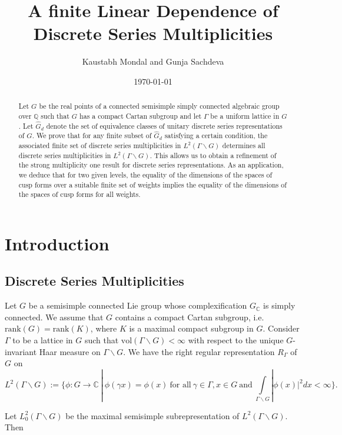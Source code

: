 \documentclass[11 pt]{amsart}
\title[Linear dependence of discrete series multiplicities]{A finite Linear Dependence of Discrete Series Multiplicities}
\author{Kaustabh Mondal and Gunja Sachdeva}
\date{\today}
\newcommand{\Q}{{\mathbb Q}}
\newcommand{\C}{{\mathbb C}}
\theoremstyle{definition}
\numberwithin{equation}{section}
\begin{document}
\begin{abstract}
    Let $G$ be the real points of a connected semisimple simply connected algebraic group over $\Q$ such that $G$ has a compact Cartan subgroup and let $\Gamma$ be a uniform lattice in $G$. Let $\widehat{G}_d$ denote the set of equivalence classes of unitary discrete series representations of $G$. We prove that for any finite subset of $\widehat{G}_d$ satisfying a certain condition, the associated finite set of discrete series multiplicities in $L^2(\Gamma \backslash G)$ determines all discrete series multiplicities in $L^2(\Gamma \backslash G)$. This allows us to obtain a refinement of the strong multiplicity one result for discrete series representations. As an application, we deduce that for two given levels, the equality of the dimensions of the spaces of cusp forms over a suitable finite set of weights implies the equality of the dimensions of the spaces of cusp forms for all weights.
\end{abstract}

\maketitle
\section{Introduction}
\subsection{Discrete Series Multiplicities}
Let $G$ be a semisimple connected Lie group whose complexification $G_{\C}$ is simply connected. We assume that $G$ contains a compact Cartan subgroup, i.e. $\text{rank} (G) = \text{rank} (K)$, where $K$ is a maximal compact subgroup in $G$. Consider $\Gamma$ to be a lattice in $G$ such that $\text{vol} (\Gamma \backslash G) < \infty$ with respect to the unique $G$-invariant Haar measure on $\Gamma \backslash G$. We have the right regular representation $R_{\Gamma}$ of $G$ on 
\begin{equation}
L^2(\Gamma \backslash G):= \{ \phi : G \rightarrow \C\ |\ \phi (\gamma x) =\phi (x)\ \text{for all}\ \gamma \in \Gamma, x \in G\ \text{and}\ \int\limits_{\Gamma \backslash G} |\phi(x)|^2 dx < \infty\}.
\end{equation}

\noindent Let $L^2_{0}(\Gamma \backslash G)$ be the maximal semisimple subrepresentation of $L^2(\Gamma \backslash G)$. Then
\end{document}

